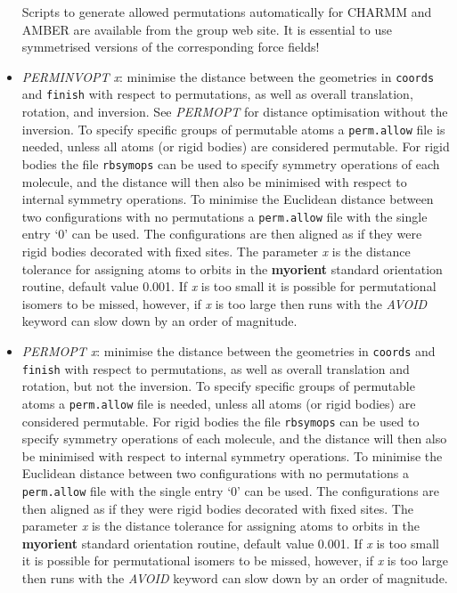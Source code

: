 \documentclass[12pt,a4paper,dvips]{article}
\begin{document}
\begin{itemize}
Scripts to generate allowed permutations automatically for CHARMM and AMBER are available from
the group web site. It is essential to use symmetrised versions of the corresponding
force fields! 

\item {\it PERMINVOPT x\/}: minimise the distance between the geometries in
{\tt coords} and {\tt finish} with respect to permutations, as well
as overall translation, rotation, and inversion. See
{\it PERMOPT\/} for distance optimisation without the inversion.
To specify specific groups of
permutable atoms a {\tt perm.allow} file is needed, unless all atoms (or rigid bodies)
are considered permutable.
For rigid bodies the file {\tt rbsymops} can be used to specify symmetry
operations of each molecule, and the distance will then also be
minimised with respect to internal symmetry operations.
To minimise the Euclidean distance between two configurations with no permutations
a {\tt perm.allow} file with the single entry `0' can be used. 
The configurations are then aligned as if they were rigid bodies decorated
with fixed sites.
The parameter {\it x} is the distance tolerance for assigning atoms to orbits
in the {\bf myorient} standard orientation routine, default value 0.001.
If {\it x} is too small it is possible for permutational isomers to be missed,
however, if {\it x\/} is too large then runs with the {\it AVOID\/} keyword can
slow down by an order of magnitude.

\item {\it PERMOPT x\/}: minimise the distance between the geometries in
{\tt coords} and {\tt finish} with respect to permutations, as well
as overall translation and rotation, but not the inversion. To specify specific groups of
permutable atoms a {\tt perm.allow} file is needed, unless all atoms (or rigid bodies)
are considered permutable.
For rigid bodies the file {\tt rbsymops} can be used to specify symmetry
operations of each molecule, and the distance will then also be
minimised with respect to internal symmetry operations.
To minimise the Euclidean distance between two configurations with no permutations
a {\tt perm.allow} file with the single entry `0' can be used. 
The configurations are then aligned as if they were rigid bodies decorated
with fixed sites.
The parameter {\it x} is the distance tolerance for assigning atoms to orbits
in the {\bf myorient} standard orientation routine, default value 0.001.
If {\it x} is too small it is possible for permutational isomers to be missed,
however, if {\it x\/} is too large then runs with the {\it AVOID\/} keyword can
slow down by an order of magnitude.


\end{itemize}
\end{document}
